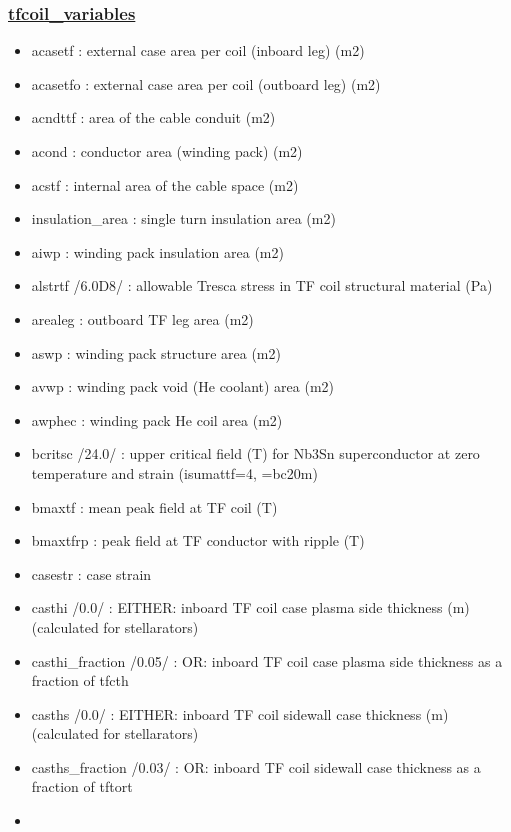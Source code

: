 \documentclass[]{article}
\begin{document}
\hypertarget{tfcoil_variables}{%
\subsubsection{\texorpdfstring{\href{tfcoil_variables.html}{tfcoil\_variables}}{tfcoil\_variables}}\label{tfcoil_variables}}

\begin{itemize}
\item
  acasetf : external case area per coil (inboard leg) (m2)
\item
  acasetfo : external case area per coil (outboard leg) (m2)
\item
  acndttf : area of the cable conduit (m2)
\item
  acond : conductor area (winding pack) (m2)
\item
  acstf : internal area of the cable space (m2)
\item
  insulation\_area : single turn insulation area (m2)
\item
  aiwp : winding pack insulation area (m2)
\item
  alstrtf /6.0D8/ : allowable Tresca stress in TF coil structural
  material (Pa)
\item
  arealeg : outboard TF leg area (m2)
\item
  aswp : winding pack structure area (m2)
\item
  avwp : winding pack void (He coolant) area (m2)
\item
  awphec : winding pack He coil area (m2)
\item
  bcritsc /24.0/ : upper critical field (T) for Nb3Sn superconductor at
  zero temperature and strain (isumattf=4, =bc20m)
\item
  bmaxtf : mean peak field at TF coil (T)
\item
  bmaxtfrp : peak field at TF conductor with ripple (T)
\item
  casestr : case strain
\item
  casthi /0.0/ : EITHER: inboard TF coil case plasma side thickness (m)
  (calculated for stellarators)
\item
  casthi\_fraction /0.05/ : OR: inboard TF coil case plasma side
  thickness as a fraction of tfcth
\item
  casths /0.0/ : EITHER: inboard TF coil sidewall case thickness (m)
  (calculated for stellarators)
\item
  casths\_fraction /0.03/ : OR: inboard TF coil sidewall case thickness
  as a fraction of tftort
\item

\end{itemize}
\end{document}

